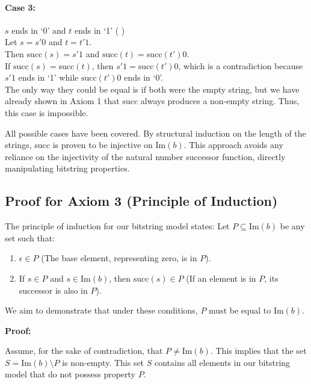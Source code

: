 \documentclass[12pt, a4paper]{article}
\begin{document}
\paragraph{Case 3:} \( s \) ends in `0' and \( t \) ends in `1' (  ) \\
Let \( s = s'0 \) and \( t = t'1 \). \\
Then \(\mathrm{succ}(s) = s'1\) and \(\mathrm{succ}(t) = \mathrm{succ}(t')0\). \\
If \(\mathrm{succ}(s) = \mathrm{succ}(t)\), then \( s'1 = \mathrm{succ}(t')0 \), which is a contradiction because \( s'1 \) ends in `1' while \(\mathrm{succ}(t')0\) ends in `0'. \\
The only way they could be equal is if both were the empty string, but we have already shown in Axiom 1 that \(\mathrm{succ}\) always produces a non-empty string. Thus, this case is impossible.

All possible cases have been covered. By structural induction on the length of the strings, \(\mathrm{succ}\) is proven to be injective on \(\mathrm{Im}(b)\). This approach avoids any reliance on the injectivity of the natural number successor function, directly manipulating bitstring properties.

\subsection*{Proof for Axiom 3 (Principle of Induction)}

The principle of induction for our bitstring model states: Let \( P \subseteq \mathrm{Im}(b) \) be any set such that:
\begin{enumerate}
    \item \( \epsilon \in P \) (The base element, representing zero, is in \( P \)).
    \item If \( s \in P \) and \( s \in \mathrm{Im}(b) \), then \( \mathrm{succ}(s) \in P \) (If an element is in \( P \), its successor is also in \( P \)).
\end{enumerate}

We aim to demonstrate that under these conditions, \( P \) must be equal to \( \mathrm{Im}(b) \).

\textbf{Proof:}

Assume, for the sake of contradiction, that \( P \neq \mathrm{Im}(b) \). This implies that the set \( S = \mathrm{Im}(b) \setminus P \) is non-empty. This set \( S \) contains all elements in our bitstring model that do not possess property \( P \).
\end{document}
